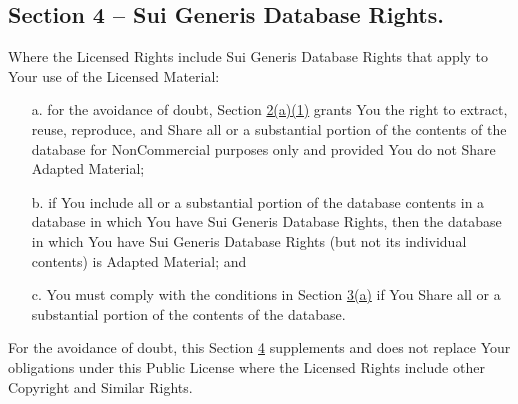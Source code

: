 \subsection*{Section 4 – Sui Generis Database Rights.}
Where the Licensed Rights include Sui Generis Database Rights that apply to Your use of the Licensed Material:
\begin{itemize}
\item[a.]
for the avoidance of doubt, Section \href{https://creativecommons.org/licenses/by-nc-nd/4.0/legalcode#s2a1}{2(a)(1)} grants You the right to extract, reuse, reproduce, and Share all or a substantial portion of the contents of the database for NonCommercial purposes only and provided You do not Share Adapted Material;
\item[b.] if You include all or a substantial portion of the database contents in a database in which You have Sui Generis Database Rights, then the database in which You have Sui Generis Database Rights (but not its individual contents) is Adapted Material; and
\item[c.] You must comply with the conditions in Section \href{https://creativecommons.org/licenses/by-nc-nd/4.0/legalcode#s3a}{3(a)} if You Share all or a substantial portion of the contents of the database.
\end{itemize}
For the avoidance of doubt, this Section \href{https://creativecommons.org/licenses/by-nc-nd/4.0/legalcode#s4}{4} supplements and does not replace Your obligations under this Public License where the Licensed Rights include other Copyright and Similar Rights.

